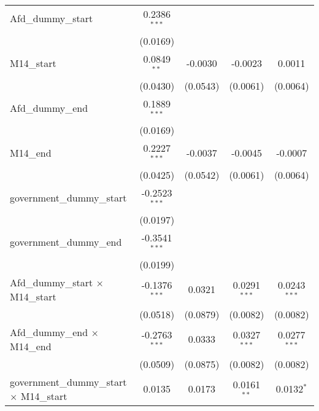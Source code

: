 \documentclass[10pt,a4paper]{article}
\begin{document}
\begin{tabular}{lcccc}
   Afd\_dummy\_start                                & 0.2386$^{***}$  &                &                 &   \\   
                                                    & (0.0169)        &                &                 &   \\   
   M14\_start                                       & 0.0849$^{**}$   & -0.0030        & -0.0023         & 0.0011\\   
                                                    & (0.0430)        & (0.0543)       & (0.0061)        & (0.0064)\\   
   Afd\_dummy\_end                                  & 0.1889$^{***}$  &                &                 &   \\   
                                                    & (0.0169)        &                &                 &   \\   
   M14\_end                                         & 0.2227$^{***}$  & -0.0037        & -0.0045         & -0.0007\\   
                                                    & (0.0425)        & (0.0542)       & (0.0061)        & (0.0064)\\   
   government\_dummy\_start                         & -0.2523$^{***}$ &                &                 &   \\   
                                                    & (0.0197)        &                &                 &   \\   
   government\_dummy\_end                           & -0.3541$^{***}$ &                &                 &   \\   
                                                    & (0.0199)        &                &                 &   \\   
   Afd\_dummy\_start $\times$ M14\_start            & -0.1376$^{***}$ & 0.0321         & 0.0291$^{***}$  & 0.0243$^{***}$\\   
                                                    & (0.0518)        & (0.0879)       & (0.0082)        & (0.0082)\\   
   Afd\_dummy\_end $\times$ M14\_end                & -0.2763$^{***}$ & 0.0333         & 0.0327$^{***}$  & 0.0277$^{***}$\\   
                                                    & (0.0509)        & (0.0875)       & (0.0082)        & (0.0082)\\   
   government\_dummy\_start $\times$ M14\_start     & 0.0135          & 0.0173         & 0.0161$^{**}$   & 0.0132$^{*}$\\   

\end{tabular}
\end{document}
